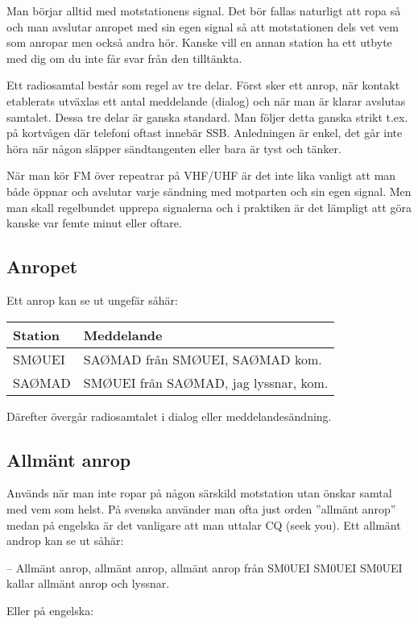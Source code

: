 Man börjar alltid med motstationens signal. Det bör fallas naturligt att ropa så
och man avslutar anropet med sin egen signal så att motstationen dels vet vem
som anropar men också andra hör. Kanske vill en annan station ha ett utbyte med
dig om du inte får svar från den tilltänkta.

Ett radiosamtal består som regel av tre delar. Först sker ett anrop, när kontakt
etablerats utväxlas ett antal meddelande (dialog) och när man är klarar avslutas
samtalet. Dessa tre delar är ganska standard. Man följer detta ganska strikt
t.ex. på kortvågen där telefoni oftast innebär SSB. Anledningen är enkel, det
går inte höra när någon släpper sändtangenten eller bara är tyst och tänker.

När man kör FM över repeatrar på VHF/UHF är det inte lika vanligt att man både
öppnar och avslutar varje sändning med motparten och sin egen signal. Men man
skall regelbundet upprepa signalerna och i praktiken är det lämpligt att göra
kanske var femte minut eller oftare.

\subsection{Anropet}

Ett anrop kan se ut ungefär såhär:

\begin{tabular}{ll}
	Station & Meddelande                            \\ \hline
	SMØUEI  & SAØMAD från SMØUEI, SAØMAD kom.       \\
	SAØMAD  & SMØUEI från SAØMAD, jag lyssnar, kom.
\end{tabular}

Därefter övergår radiosamtalet i dialog eller meddelandesändning.

\subsection{Allmänt anrop}

Används när man inte ropar på någon särskild motstation utan önskar samtal med
vem som helst. På svenska använder man ofta just orden ''allmänt anrop'' medan
på engelska är det vanligare att man uttalar CQ (seek you). Ett allmänt androp
kan se ut såhär:

-- Allmänt anrop, allmänt anrop, allmänt anrop från SM0UEI SM0UEI SM0UEI kallar
allmänt anrop och lyssnar.

Eller på engelska:


